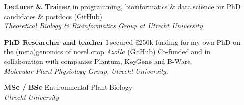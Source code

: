 \documentclass[a4paper,10pt]{article}
\begin{document}
{\begin{adjustbox}{valign=t}
\begin{minipage}[t]{0.3\textwidth}
\begin{spacing}{1}
\begin{itemize}

\end{itemize}
\end{spacing}


\end{minipage}%
\end{adjustbox}%
\hfill%


\begin{adjustbox}{valign=t}
\hfill%
\begin{minipage}[t]{0.05\textwidth}
\MyVerticalRule
\end{minipage}%
\end{adjustbox}

\begin{adjustbox}{valign=t}
\hfill%
\begin{minipage}[t]{0.6\textwidth}


\begin{description}
\raggedright
  \item[\normalfont \textcolor{ForestGreen}{\textbf{2022 -- now.}}] \textbf{Lecturer \&  Trainer} 
    in programming, bioinformatics \& data science for PhD candidates \& postdocs 
    (\href{https://github.com/lauralwd/professional_education}{GitHub})\\
    \textit{Theoretical Biology \& Bioinformatics Group at Utrecht University}
  \item[\normalfont \textcolor{ForestGreen}{\textbf{2017 -- 2022.}}] \textbf{PhD Researcher and teacher} 
    I secured €250k funding for my own PhD on the (meta)genomics of novel crop \textit{Azolla} 
    (\href{https://github.com/lauralwd/azolla_phd_thesis}{GitHub}) 
    Co-funded and in collaboration with companies Plantum, KeyGene and B-Ware.\\ 
    \textit{Molecular Plant Physiology Group, Utrecht University.}
  \item[\normalfont \textcolor{ForestGreen}{\textbf{2010 -- 2017.}}] \textbf{MSc / BSc} Environmental Plant Biology \\
    \textit{Utrecht University}
\end{description}


\end{minipage}
\end{adjustbox}}
\end{document}
